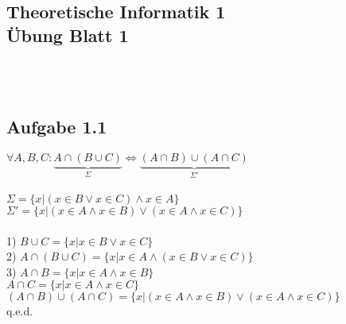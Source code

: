 \documentclass[11pt,a4paper]{article}
\begin{document}
\begin{center}
\section*{ Theoretische Informatik 1 \\ Übung Blatt 1}
\end{center}
\ \\ \ \\
\subsection*{Aufgabe 1.1}
$\forall A,B,C: \underset{\Sigma}{\underbrace{A \cap (B \cup C)}} \Leftrightarrow \underset{\Sigma'}{\underbrace{(A \cap B) \cup (A \cap C)}}$\\
\ \\
$\Sigma = \{ x|(x \in B \vee x \in C) \wedge x \in A \}$\\
$\Sigma' = \{ x|(x \in A \wedge x \in B) \vee (x \in A \wedge x \in C) \}$\\
\ \\
1) $B \cup C = \{ x| x \in B \vee x \in C \}$\\
2) $A \cap (B \cup C) = \{ x|x \in A \wedge ( x \in B \vee x \in C )\}$\\
3) $A \cap B = \{x|x \in A \wedge x \in B\}$\\
\hspace*{5mm}$ A \cap C = \{x|x \in A \wedge x \in C \}$\\
\hspace*{5mm}$ (A \cap B) \cup (A \cap C) = \{x|(x \in A \wedge x \in B) \vee (x \in A \wedge x \in C) \}$\\
\hspace*{10,5cm}q.e.d.
\end{document}
